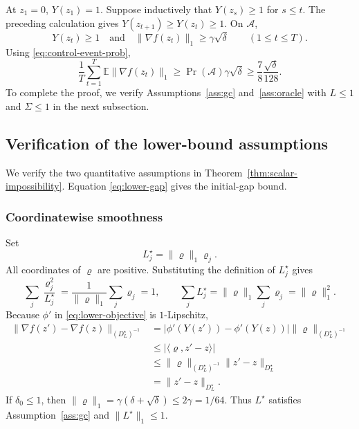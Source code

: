 \documentclass[11pt,letterpaper]{article}
\theoremstyle{definition}
\newcommand{\E}{\mathbb E}
\newcommand{\grad}{\nabla}
\begin{document}
At $z_1=0$, $Y(z_1)=1$.  Suppose inductively that $Y(z_s)\ge1$ for $s\le t$.  The preceding calculation gives $Y(z_{t+1})\ge Y(z_t)\ge1$.  On $\mathcal A$,
\begin{equation}
Y(z_t)\ge1
\quad\text{and}\quad
\|\grad f(z_t)\|_1\ge\gamma\sqrt\delta
\qquad(1\le t\le T).
\label{eq:lower-active-all-time}
\end{equation}
Using \eqref{eq:control-event-prob},
\begin{equation}
\frac1T\sum_{t=1}^T\E\|\grad f(z_t)\|_1
\ge\Pr(\mathcal A)\gamma\sqrt\delta
\ge\frac78\frac{\sqrt\delta}{128}.
\label{eq:lower-final}
\end{equation}
To complete the proof, we verify Assumptions~\ref{ass:gc} and~\ref{ass:oracle} with $L\le1$ and $\Sigma\le1$ in the next subsection.

\subsection{Verification of the lower-bound assumptions}
\label{app:lower-verification}

We verify the two quantitative assumptions in Theorem~\ref{thm:scalar-impossibility}.  Equation \eqref{eq:lower-gap} gives the initial-gap bound.

\subsubsection{Coordinatewise smoothness}

Set
\begin{equation}
L_j^\star=\|\varrho\|_1\varrho_j.
\label{eq:lower-L-certificate}
\end{equation}
All coordinates of $\varrho$ are positive. Substituting the definition
of $L_j^\star$ gives
\begin{equation}
\sum_j\frac{\varrho_j^2}{L_j^\star}
=\frac1{\|\varrho\|_1}\sum_j\varrho_j=1,
\qquad
\sum_jL_j^\star=\|\varrho\|_1\sum_j\varrho_j=\|\varrho\|_1^2.
\label{eq:lower-L-identities}
\end{equation}
Because $\phi'$ in \eqref{eq:lower-objective} is $1$-Lipschitz,
\begin{align}
\|\grad f(z')-\grad f(z)\|_{(D_L^\star)^{-1}}
&=|\phi'(Y(z'))-\phi'(Y(z))|
\|\varrho\|_{(D_L^\star)^{-1}}\\
&\le|\langle\varrho,z'-z\rangle|\\
&\le\|\varrho\|_{(D_L^\star)^{-1}}
\|z'-z\|_{D_L^\star}\\
&=\|z'-z\|_{D_L^\star}.
\label{eq:lower-GC-proof}
\end{align}
If
$\delta_0\le1$, then $\|\varrho\|_1=\gamma(\delta+\sqrt\delta)\le2\gamma=1/64$.
Thus $L^\star$ satisfies Assumption~\ref{ass:gc} and $\|L^\star\|_1\le1$.
\end{document}
